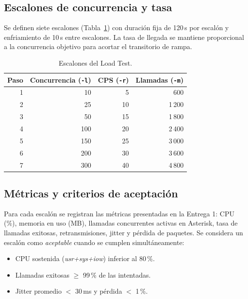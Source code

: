 \documentclass[conference]{IEEEtran}
\begin{document}
\subsection{Escalones de concurrencia y tasa}

Se definen siete escalones (Tabla~\ref{tab:escalones}) con duraci\'on
fija de 120\,s por escal\'on y enfriamiento de 10\,s entre escalones.
La tasa de llegada se mantiene proporcional a la concurrencia objetivo
para acortar el transitorio de rampa.

\begin{table}[!t]
\caption{Escalones del Load Test.}
\label{tab:escalones}
\renewcommand{\arraystretch}{1.2}
\setlength{\tabcolsep}{6pt}
\begin{center}
\footnotesize
\begin{tabular}{@{}rrrr@{}}
\toprule
\textbf{Paso} & \textbf{Concurrencia (\texttt{-l})} & \textbf{CPS (\texttt{-r})} & \textbf{Llamadas (\texttt{-m})} \\
\midrule
1 & 10  & 5  & 600   \\
2 & 25  & 10 & 1\,200 \\
3 & 50  & 15 & 1\,800 \\
4 & 100 & 20 & 2\,400 \\
5 & 150 & 25 & 3\,000 \\
6 & 200 & 30 & 3\,600 \\
7 & 300 & 40 & 4\,800 \\
\bottomrule
\end{tabular}
\end{center}
\end{table}

\subsection{M\'etricas y criterios de aceptaci\'on}

Para cada escal\'on se registran las m\'etricas presentadas en la
Entrega 1: CPU (\%), memoria en uso (MB), llamadas concurrentes
activas en Asterisk, tasa de llamadas exitosas, retransmisiones,
jitter y p\'erdida de paquetes. Se considera un escal\'on como
\textit{aceptable} cuando se cumplen simult\'aneamente:

\begin{itemize}
    \item CPU sostenida (\textit{usr+sys+iow}) inferior al 80\,\%.
    \item Llamadas exitosas $\geq$ 99\,\% de las intentadas.
    \item Jitter promedio $<$ 30\,ms y p\'erdida $<$ 1\,\%.
\end{itemize}
\end{document}
